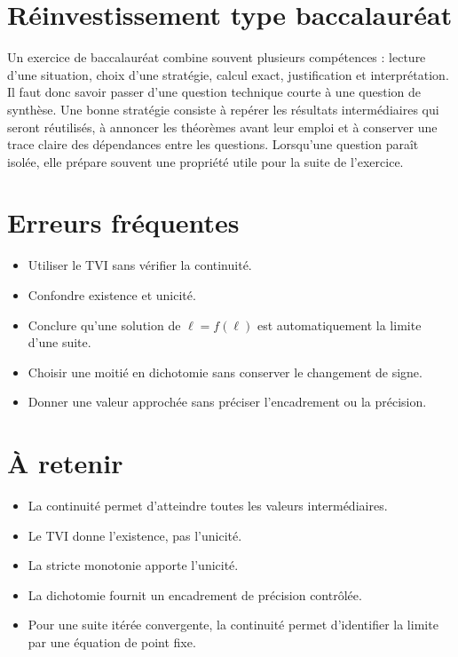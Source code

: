 \section{Réinvestissement type baccalauréat}
Un exercice de baccalauréat combine souvent plusieurs compétences : lecture d'une situation, choix d'une stratégie, calcul exact, justification et interprétation. Il faut donc savoir passer d'une question technique courte à une question de synthèse. Une bonne stratégie consiste à repérer les résultats intermédiaires qui seront réutilisés, à annoncer les théorèmes avant leur emploi et à conserver une trace claire des dépendances entre les questions. Lorsqu'une question paraît isolée, elle prépare souvent une propriété utile pour la suite de l'exercice.

\section{Erreurs fréquentes}
\begin{itemize}
\item Utiliser le TVI sans vérifier la continuité.
\item Confondre existence et unicité.
\item Conclure qu’une solution de $\ell=f(\ell)$ est automatiquement la limite d’une suite.
\item Choisir une moitié en dichotomie sans conserver le changement de signe.
\item Donner une valeur approchée sans préciser l’encadrement ou la précision.
\end{itemize}

\section{À retenir}
\begin{aretenir}
\begin{itemize}
\item La continuité permet d’atteindre toutes les valeurs intermédiaires.
\item Le TVI donne l’existence, pas l’unicité.
\item La stricte monotonie apporte l’unicité.
\item La dichotomie fournit un encadrement de précision contrôlée.
\item Pour une suite itérée convergente, la continuité permet d’identifier la limite par une équation de point fixe.
\end{itemize}
\end{aretenir}
